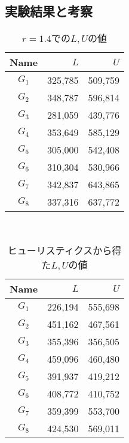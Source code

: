 \documentclass[10pt,a4paper,notitlepage,oneside,twocolumn]{abst_jsarticle}
\begin{document}
\subsection{実験結果と考察}

\begin{table}[htbp]
  \small
  \caption{$r=1.4$での$L, U$の値}
  \label{table:r}
  \centering
  \begin{tabular}{c|rr}
    \hline
    Name & $L$ & $U$ \\
    \hline\hline
    $G_1$ & 325{,}785 & 509{,}759 \\
    $G_2$ & 348{,}787 & 596{,}814 \\
    $G_3$ & 281{,}059 & 439{,}776 \\
    $G_4$ & 353{,}649 & 585{,}129 \\
    $G_5$ & 305{,}000 & 542{,}408 \\
    $G_6$ & 310{,}304 & 530{,}966 \\
    $G_7$ & 342{,}837 & 643{,}865 \\
    $G_8$ & 337{,}316 & 637{,}772 \\
    \hline
  \end{tabular}
\end{table}

\begin{table}[htbp]
　\small
  \caption{ヒューリスティクスから得た$L, U$の値}
  \label{table:huristic}
  \centering
  \begin{tabular}{c|rr}
    \hline
    Name & $L$ & $U$ \\
    \hline\hline
    $G_1$ & 226{,}194 & 555{,}698 \\
    $G_2$ & 451{,}162 & 467{,}561 \\
    $G_3$ & 355{,}396 & 356{,}505 \\
    $G_4$ & 459{,}096 & 460{,}480 \\
    $G_5$ & 391{,}937 & 419{,}212 \\
    $G_6$ & 408{,}772 & 410{,}752 \\
    $G_7$ & 359{,}399 & 553{,}700 \\
    $G_8$ & 424{,}530 & 569{,}011 \\
    \hline
  \end{tabular}
\end{table}
\end{document}
